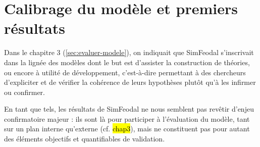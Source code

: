 \clearpage
\section{Calibrage du modèle et premiers résultats}

Dans le chapitre 3 (\cref{sec:evaluer-modele}), on indiquait que SimFeodal s'inscrivait dans la lignée des  modèles dont le but est d'\og assister la construction de théories\fg{}, ou encore \og à utilité de développement\fg{}, c'est-à-dire permettant à des chercheurs d'expliciter et de vérifier la cohérence de leurs hypothèses plutôt qu'à les infirmer ou confirmer.

En tant que tels, les \og résultats\fg{} de SimFeodal ne nous semblent pas revêtir d'enjeu confirmatoire majeur : ils sont là pour participer à l'évaluation du modèle, tant sur un plan interne qu'externe (cf. \hl{chap3}), mais ne constituent pas pour autant des éléments objectifs et quantifiables de validation.

